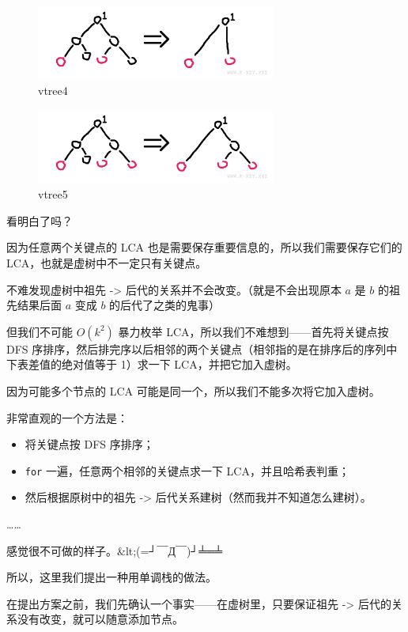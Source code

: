 \begin{figure}[htbp]
\centering
\includegraphics[width=0.7\textwidth]{docs/ds/images/vtree4.png} 
\caption{vtree4}
\end{figure}

\begin{figure}[htbp]
\centering
\includegraphics[width=0.7\textwidth]{docs/ds/images/vtree5.png} 
\caption{vtree5}
\end{figure}

看明白了吗？

因为任意两个关键点的 LCA 也是需要保存重要信息的，所以我们需要保存它们的 LCA，也就是虚树中不一定只有关键点。

不难发现虚树中祖先 -> 后代的关系并不会改变。（就是不会出现原本 $a$ 是 $b$ 的祖先结果后面 $a$ 变成 $b$ 的后代了之类的鬼事）

但我们不可能 $O(k^2)$ 暴力枚举 LCA，所以我们不难想到——首先将关键点按 DFS 序排序，然后排完序以后相邻的两个关键点（相邻指的是在排序后的序列中下表差值的绝对值等于 1）求一下 LCA，并把它加入虚树。

因为可能多个节点的 LCA 可能是同一个，所以我们不能多次将它加入虚树。

非常直观的一个方法是：

\begin{itemize}
\item 将关键点按 DFS 序排序；
\item \texttt{for} 一遍，任意两个相邻的关键点求一下 LCA，并且哈希表判重；
\item 然后根据原树中的祖先 -> 后代关系建树（然而我并不知道怎么建树）。
\end{itemize}

……

感觉很不可做的样子。\&lt;(=┘￣Д￣)┘╧═╧

所以，这里我们提出一种用单调栈的做法。

在提出方案之前，我们先确认一个事实——在虚树里，只要保证祖先 -> 后代的关系没有改变，就可以随意添加节点。

